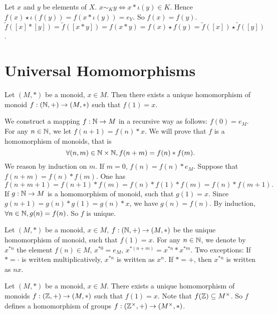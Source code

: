 \begin{proofenv}
    Let $x$ and $y$ be elements of $X$. $x\sim_K y\Leftrightarrow x*\iota(y)\in K$. Hence $f(x)\star \iota(f(y))=f(x*\iota(y))=e_Y$. So $f(x)=f(y)$. $\tilde{f}([x]*[y])=\tilde{f}([x*y])=f(x*y)=f(x)\star f(y)=\tilde{f}([x])\star \tilde{f}([y])$.
\end{proofenv}

\section{Universal Homomorphisms}
\begin{propositionenv}
    Let $(M, *)$ be a monoid,  $x\in M$. Then there exists a unique homomorphism of monoid $f:(\mathbb{N}, +)\rightarrow (M, *)$ such that $f(1)=x$.
\end{propositionenv}
\begin{proofenv}
    We construct a mapping $f:\mathbb{N}\rightarrow M$ in a recursive way as follows: $f(0)=e_M$. For any $n\in \mathbb{N}$,  we let $f(n+1)=f(n)*x$. We will prove that $f$ is a homomorphism of monoids,  that is 
    $$\forall (n, m)\in \mathbb{N}\times \mathbb{N}, f(n+m)=f(n)*f(m).$$
    We reason by induction on $m$. If $m=0$,  $f(n)=f(n)*e_M$. Suppose that $f(n+m)=f(n)*f(m)$. One has $$f(n+m+1)=f(n+1)*f(m)=f(n)*f(1)*f(m)=f(n)*f(m+1).$$
    If $g:\mathbb{N}\rightarrow M$ is a homomorphism of monoid,  such that $g(1)=x$. Since $g(n+1)=g(n)*g(1)=g(n)*x$,  we have $g(n)=f(n)$. By induction,  $\forall n\in \mathbb{N}, g(n)=f(n)$. So $f$ is unique.
\end{proofenv}
\begin{notationenv}
    Let $(M, *)$ be a monoid,  $x\in M$,  $f:(\mathbb{N}, +)\rightarrow (M, *)$ be the unique homomorphism of monoid,  such that $f(1)=x$. For any $n\in \mathbb{N}$,  we denote by $x^{*n}$ the element $f(n)\in M$,  $x^{*0}=e_M$,  $x^{*(n+m)}=x^{*n}*x^{*m}$.
    \newline
    Two exceptions: If $*=\cdot$ is written multiplicatively,  $x^{*n}$ is written as $x^n$. If $*=+$,  then $x^{*n}$ is written as $nx$. 
\end{notationenv}
\begin{propositionenv}
    Let $(M, *)$ be a monoid,  $x\in M$. There exists a unique homomorphism of monoids $f:(\mathbb{Z}, +)\rightarrow (M, *)$ such that $f(1)=x$. Note that  $f(\mathbb{Z})\subseteq M^\times$. So $f$ defines a homomorphism of groups $f:(\mathbb{Z}^\times, +)\rightarrow (M^\times, *)$.
\end{propositionenv}
